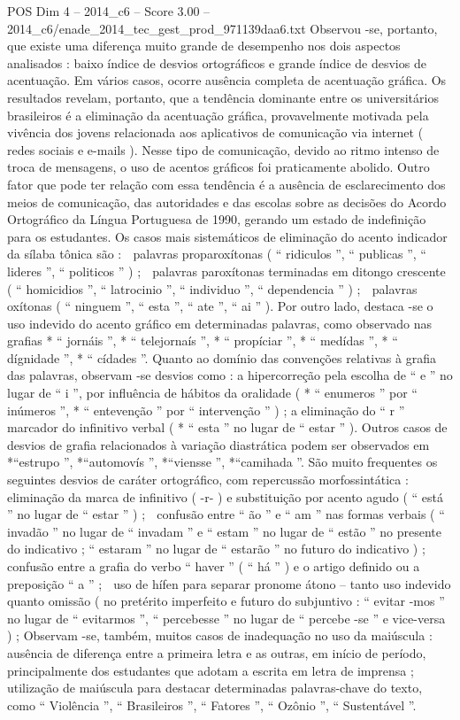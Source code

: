 \begin{textsample}{POS Dim 4 – 2014\_c6 – Score 3.00 – 2014\_c6/enade\_2014\_tec\_gest\_prod\_971139daa6.txt}
Observou -se, portanto, que existe uma diferença muito grande de desempenho nos dois aspectos analisados : baixo índice de desvios ortográficos e grande índice de desvios de acentuação.
Em vários casos, ocorre ausência completa de acentuação gráfica.
Os resultados revelam, portanto, que a tendência dominante entre os universitários brasileiros é a eliminação da acentuação gráfica, provavelmente motivada pela vivência dos jovens relacionada aos aplicativos de comunicação via internet ( redes sociais e e-mails ).
Nesse tipo de comunicação, devido ao ritmo intenso de troca de mensagens, o uso de acentos gráficos foi praticamente abolido.
Outro fator que pode ter relação com essa tendência é a ausência de esclarecimento dos meios de comunicação, das autoridades e das escolas sobre as decisões do Acordo Ortográfico da Língua Portuguesa de 1990, gerando um estado de indefinição para os estudantes.
Os casos mais sistemáticos de eliminação do acento indicador da sílaba tônica são :  palavras proparoxítonas ( “ ridiculos ”, “ publicas ”, “ lideres ”, “ politicos ” ) ;  palavras paroxítonas terminadas em ditongo crescente ( “ homicidios ”, “ latrocinio ”, “ individuo ”, “ dependencia ” ) ;  palavras oxítonas ( “ ninguem ”, “ esta ”, “ ate ”, “ ai ” ).
Por outro lado, destaca -se o uso indevido do acento gráfico em determinadas palavras, como observado nas grafias * “ jornáis ”, * “ telejornaís ”, * “ propíciar ”, * “ medídas ”, * “ dígnidade ”, * “ cídades ”.
Quanto ao domínio das convenções relativas à grafia das palavras, observam -se desvios como : a hipercorreção pela escolha de “ e ” no lugar de “ i ”, por influência de hábitos da oralidade ( * “ enumeros ” por “ inúmeros ”, * “ entevenção ” por “ intervenção ” ) ; a eliminação do “ r ” marcador do infinitivo verbal ( * “ esta ” no lugar de “ estar ” ).
Outros casos de desvios de grafia relacionados à variação diastrática podem ser observados em *“estrupo ”, *“automovís ”, *“viensse ”, *“camihada ”.
São muito frequentes os seguintes desvios de caráter ortográfico, com repercussão morfossintática :  eliminação da marca de infinitivo ( -r- ) e substituição por acento agudo ( “ está ” no lugar de “ estar ” ) ;  confusão entre “ ão ” e “ am ” nas formas verbais ( “ invadão ” no lugar de “ invadam ” e “ estam ” no lugar de “ estão ” no presente do indicativo ; “ estaram ” no lugar de “ estarão ” no futuro do indicativo ) ;  confusão entre a grafia do verbo “ haver ” ( “ há ” ) e o artigo definido ou a preposição “ a ” ;  uso de hífen para separar pronome átono – tanto uso indevido quanto omissão ( no pretérito imperfeito e futuro do subjuntivo : “ evitar -mos ” no lugar de “ evitarmos ”, “ percebesse ” no lugar de “ percebe -se ” e vice-versa ) ; Observam -se, também, muitos casos de inadequação no uso da maiúscula : ausência de diferença entre a primeira letra e as outras, em início de período, principalmente dos estudantes que adotam a escrita em letra de imprensa ; utilização de maiúscula para destacar determinadas palavras-chave do texto, como “ Violência ”, “ Brasileiros ”, “ Fatores ”, “ Ozônio ”, “ Sustentável ”.

\end{textsample}
